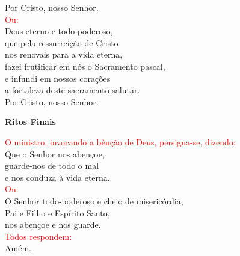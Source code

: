 \documentclass{book}
\begin{document}
\begin{flushleft}
    Por Cristo, nosso Senhor.
    \vspace{.1cm} \\
    \textcolor{red}{Ou:}
    \vspace{.1cm} \\
    Deus eterno e todo-poderoso, \\
    que pela ressurreição de Cristo \\
    nos renovais para a vida eterna, \\
    fazei frutificar em nós o Sacramento pascal, \\
    e infundi em nossos corações \\
    a fortaleza deste sacramento salutar. \\
    Por Cristo, nosso Senhor.
\end{flushleft}
\begin{center}
    \textbf{Ritos Finais}
\end{center}
\begin{flushleft}
    \textcolor{red}{O ministro, invocando a bênção de Deus, persigna-se, dizendo:}
    \vspace{.1cm} \\
    Que o Senhor nos abençoe, \\
    guarde-nos de todo o mal \\
    e nos conduza à vida eterna.
    \vspace{.1cm} \\
    \textcolor{red}{Ou:}
    \vspace{.1cm} \\
    O Senhor todo-poderoso e cheio de misericórdia, \\
    Pai e Filho e Espírito Santo, \\
    nos abençoe e nos guarde.
    \vspace{.1cm} \\
    \textcolor{red}{Todos respondem:}
    \vspace{.1cm} \\
    Amém.
\end{flushleft}
\end{document}
